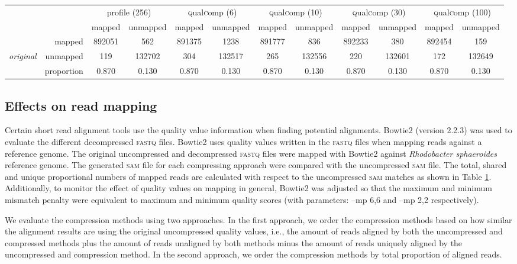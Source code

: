 \documentclass{bioinfo}
\begin{document}
\begin{table}[!tbhp]
\begin{small}
\begin{tabular}{lr|cc|cc|cc|cc|cc}
&  & \multicolumn{2}{c|}{profile (256)} & \multicolumn{2}{c|}{\textsc{q}ual\textsc{c}omp (6)} & \multicolumn{2}{c|}{\textsc{q}ual\textsc{c}omp (10)} & \multicolumn{2}{c|}{\textsc{q}ual\textsc{c}omp (30)} & \multicolumn{2}{c}{\textsc{q}ual\textsc{c}omp (100)} \\
& &  mapped & unmapped & mapped & unmapped & mapped & unmapped & mapped & unmapped & mapped & unmapped \\ 
\cline{2-12}
& mapped & 892051 & 562 & 891375 & 1238 & 891777 & 836 & 892233 & 380 & 892454 & 159 \\ 
{\em original}  & unmapped & 119 & 132702 & 304 & 132517 & 265 & 132556 & 220 & 132601 & 172 & 132649 \\ 
\cline{2-12}
& proportion & 0.870 & 0.130 & 0.870 & 0.130 & 0.870 & 0.130 & 0.870 & 0.130 & 0.870 & 0.130 \\
\end{tabular}
\end{small}

\label{tab:aligner}
\end{table}


\subsection{Effects on read mapping}

Certain short read alignment tools use the quality value information
when finding potential alignments. Bowtie2 (version 2.2.3) was used to
evaluate the different decompressed \textsc{fastq} files. Bowtie2 uses
quality values written in the \textsc{fastq} files when mapping reads
against a reference genome. The original uncompressed and decompressed
\textsc{fastq} files were mapped with Bowtie2 against
\textit{Rhodobacter sphaeroides} reference genome. The generated
\textsc{sam} file for each compressing approach were compared with the
uncompressed \textsc{sam} file. The total, shared and unique
proportional numbers of mapped reads are calculated with respect to
the uncompressed \textsc{sam} matches as shown in Table
\ref{tab:aligner}. Additionally, to monitor the effect of quality
values on mapping in general, Bowtie2 was adjusted so that the maximum
and minimum mismatch penalty were equivalent to maximum and minimum
quality scores (with parameters: --mp 6,6 and --mp 2,2 respectively).

We evaluate the compression methods using two approaches. In the first
approach, we order the compression methods based on how similar the
alignment results are using the original uncompressed quality values,
i.e., the amount of reads aligned by both the uncompressed and
compressed methods plus the amount of reads unaligned by both methods
minus the amount of reads uniquely aligned by the uncompressed and
compression method. In the second approach, we order the compression
methods by total proportion of aligned reads.
\end{document}
